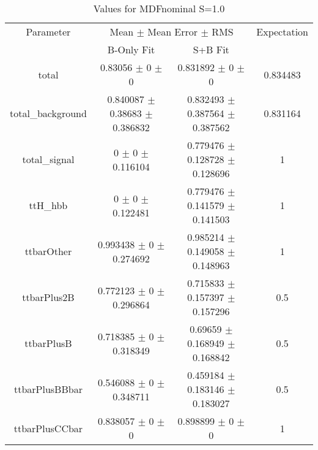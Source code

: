 \begin{table}
\centering
\caption{Values for MDFnominal S=1.0}
\begin{tabular}{cccc}
\toprule
Parameter & \multicolumn{2}{c}{Mean $\pm$ Mean Error $\pm$ RMS} & Expectation\\
 & B-Only Fit & S+B Fit & \\
\midrule
total & \num{0.83056} $\pm$ \num{0} $\pm$ \num{0} & \num{0.831892} $\pm$ \num{0} $\pm$ \num{0} & \num{0.834483}\\
total\_background & \num{0.840087} $\pm$ \num{0.38683} $\pm$ \num{0.386832} & \num{0.832493} $\pm$ \num{0.387564} $\pm$ \num{0.387562} & \num{0.831164}\\
total\_signal & \num{0} $\pm$ \num{0} $\pm$ \num{0.116104} & \num{0.779476} $\pm$ \num{0.128728} $\pm$ \num{0.128696} & \num{1}\\
ttH\_hbb & \num{0} $\pm$ \num{0} $\pm$ \num{0.122481} & \num{0.779476} $\pm$ \num{0.141579} $\pm$ \num{0.141503} & \num{1}\\
ttbarOther & \num{0.993438} $\pm$ \num{0} $\pm$ \num{0.274692} & \num{0.985214} $\pm$ \num{0.149058} $\pm$ \num{0.148963} & \num{1}\\
ttbarPlus2B & \num{0.772123} $\pm$ \num{0} $\pm$ \num{0.296864} & \num{0.715833} $\pm$ \num{0.157397} $\pm$ \num{0.157296} & \num{0.5}\\
ttbarPlusB & \num{0.718385} $\pm$ \num{0} $\pm$ \num{0.318349} & \num{0.69659} $\pm$ \num{0.168949} $\pm$ \num{0.168842} & \num{0.5}\\
ttbarPlusBBbar & \num{0.546088} $\pm$ \num{0} $\pm$ \num{0.348711} & \num{0.459184} $\pm$ \num{0.183146} $\pm$ \num{0.183027} & \num{0.5}\\
ttbarPlusCCbar & \num{0.838057} $\pm$ \num{0} $\pm$ \num{0} & \num{0.898899} $\pm$ \num{0} $\pm$ \num{0} & \num{1}\\
\bottomrule
\end{tabular}
\end{table}